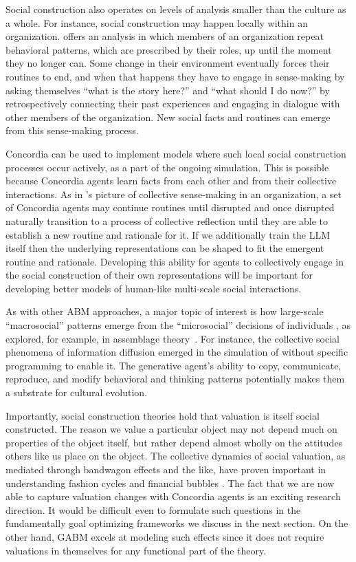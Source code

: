 \documentclass[11pt, a4paper, logo, twocolumn, internal, copyright, numbering]{googledeepmind}
\begin{document}
Social construction also operates on levels of analysis smaller than the culture as a whole. For instance, social construction may happen locally within an organization. \cite{weick2005sensemaking} offers an analysis in which members of an organization repeat behavioral patterns, which are prescribed by their roles, up until the moment they no longer can. Some change in their environment eventually forces their routines to end, and when that happens they have to engage in sense-making by asking themselves ``what is the story here?'' and ``what should I do now?'' by retrospectively connecting their past experiences and engaging in dialogue with other members of the organization. New social facts and routines can emerge from this sense-making process.

Concordia can be used to implement models where such local social construction processes occur actively, as a part of the ongoing simulation. This is possible because Concordia agents learn facts from each other and from their collective interactions. As in \cite{weick2005sensemaking}'s picture of collective sense-making in an organization, a set of Concordia agents may continue routines until disrupted and once disrupted naturally transition to a process of collective reflection until they are able to establish a new routine and rationale for it. If we additionally train the LLM itself then the underlying representations can be shaped to fit the emergent routine and rationale. Developing this ability for agents to collectively engage in the social construction of their own representations will be important for developing better models of human-like multi-scale social interactions.

As with other ABM approaches, a major topic of interest is how large-scale ``macrosocial'' patterns emerge from the ``microsocial'' decisions of individuals \citep{macy2002factors}, as explored, for example, in assemblage theory~\citep{delanda2016assemblage, delanda2011philosophy}. For instance, the collective social phenomena of information diffusion emerged in the simulation of \cite{park2023generative} without specific programming to enable it. The generative agent's ability to copy, communicate, reproduce, and modify behavioral and thinking patterns potentially makes them a substrate for cultural evolution.%

Importantly, social construction theories hold that valuation is itself social constructed. The reason we value a particular object may not depend much on properties of the object itself, but rather depend almost wholly on the attitudes others like us place on the object. The collective dynamics of social valuation, as mediated through bandwagon effects and the like, have proven important in understanding fashion cycles and financial bubbles \citep{zuckerman2012construction}. The fact that we are now able to capture valuation changes with Concordia agents is an exciting research direction. It would be difficult even to formulate such questions in the fundamentally goal optimizing frameworks we discuss in the next section. On the other hand, GABM excels at modeling such effects since it does not require valuations in themselves for any functional part of the theory.
\end{document}
